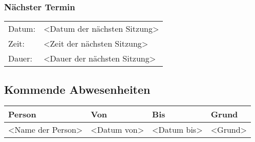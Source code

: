 \subsubsection*{Nächster Termin}

\begin{tabular}{p{4cm} p{12cm}}
    Datum: & <Datum der nächsten Sitzung> \\
    Zeit: & <Zeit der nächsten Sitzung> \\
    Dauer: & <Dauer der nächsten Sitzung> \\
\end{tabular}

\vspace{1cm}

\subsection*{Kommende Abwesenheiten}
\begin{table}[H]
    \centering
    \begin{tabular}{p{4cm} p{3cm} p{3cm} p{6cm}}
        \textbf{Person} & \textbf{Von} & \textbf{Bis} & \textbf{Grund} \\ \hline
        <Name der Person> & <Datum von> & <Datum bis> & <Grund>  \\ \hline
    \end{tabular}
\end{table}

